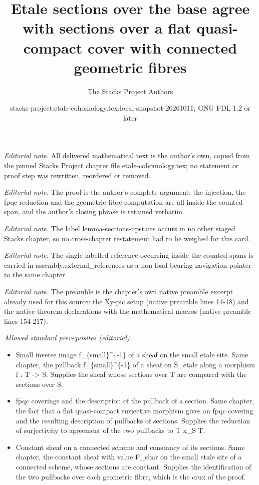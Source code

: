\documentclass[10pt,a4paper]{amsart}
\title{Etale sections over the base agree with sections over a flat quasi-compact cover with connected geometric fibres}
\author{The Stacks Project Authors}
\date{stacks-project:etale-cohomology.tex:local-snapshot-20261011; GNU FDL 1.2 or later}
\theoremstyle{plain}
\theoremstyle{definition}
\theoremstyle{remark}
\numberwithin{equation}{subsection}
\begin{document}
\maketitle
\noindent\textit{Editorial note.} All delivered mathematical text is the author's own, copied from the pinned Stacks Project chapter file etale-cohomology.tex; no statement or proof step was rewritten, reordered or removed.\par\medskip
\noindent\textit{Editorial note.} The proof is the author's complete argument: the injection, the fpqc reduction and the geometric-fibre computation are all inside the counted span, and the author's closing phrase is retained verbatim.\par\medskip
\noindent\textit{Editorial note.} The label lemma-sections-upstairs occurs in no other staged Stacks chapter, so no cross-chapter restatement had to be weighed for this card.\par\medskip
\noindent\textit{Editorial note.} The single labelled reference occurring inside the counted spans is carried in assembly.external\_references as a non-load-bearing navigation pointer to the same chapter.\par\medskip
\noindent\textit{Editorial note.} The preamble is the chapter's own native preamble excerpt already used for this source: the Xy-pic setup (native preamble lines 14-18) and the native theorem declarations with the mathematical macros (native preamble lines 154-217).\par\medskip
\noindent\textit{Allowed standard prerequisites (editorial).}\begin{itemize}
\item Small inverse image f\_\{small\}\textasciicircum{}\{-1\} of a sheaf on the small etale site. Same chapter, the pullback f\_\{small\}\textasciicircum{}\{-1\} of a sheaf on S\_etale along a morphism f : T -> S. Supplies the sheaf whose sections over T are compared with the sections over S.
\item fpqc coverings and the description of the pullback of a section. Same chapter, the fact that a flat quasi-compact surjective morphism gives an fpqc covering and the resulting description of pullbacks of sections. Supplies the reduction of surjectivity to agreement of the two pullbacks to T x\_S T.
\item Constant sheaf on a connected scheme and constancy of its sections. Same chapter, the constant sheaf with value F\_sbar on the small etale site of a connected scheme, whose sections are constant. Supplies the identification of the two pullbacks over each geometric fibre, which is the crux of the proof.
\end{itemize}\medskip
\end{document}
